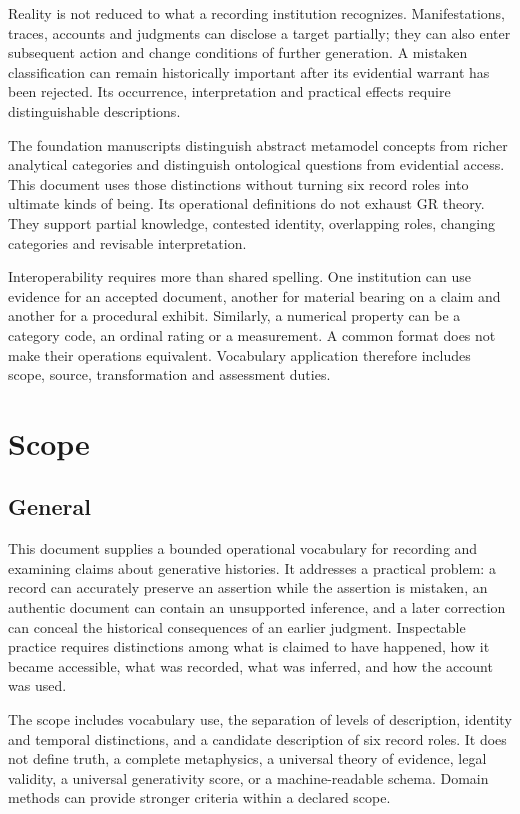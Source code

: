 \documentclass[11pt,a4paper]{article}
\begin{document}
Reality is not reduced to what a recording institution recognizes. Manifestations, traces, accounts and judgments can disclose a target partially; they can also enter subsequent action and change conditions of further generation. A mistaken classification can remain historically important after its evidential warrant has been rejected. Its occurrence, interpretation and practical effects require distinguishable descriptions.

The foundation manuscripts distinguish abstract metamodel concepts from richer analytical categories and distinguish ontological questions from evidential access. This document uses those distinctions without turning six record roles into ultimate kinds of being. Its operational definitions do not exhaust GR theory. They support partial knowledge, contested identity, overlapping roles, changing categories and revisable interpretation.

Interoperability requires more than shared spelling. One institution can use evidence for an accepted document, another for material bearing on a claim and another for a procedural exhibit. Similarly, a numerical property can be a category code, an ordinal rating or a measurement. A common format does not make their operations equivalent. Vocabulary application therefore includes scope, source, transformation and assessment duties.

\GSPmainmatter
\section{Scope}
\subsection{General}

This document supplies a bounded operational vocabulary for recording and examining claims about generative histories. It addresses a practical problem: a record can accurately preserve an assertion while the assertion is mistaken, an authentic document can contain an unsupported inference, and a later correction can conceal the historical consequences of an earlier judgment. Inspectable practice requires distinctions among what is claimed to have happened, how it became accessible, what was recorded, what was inferred, and how the account was used.

The scope includes vocabulary use, the separation of levels of description, identity and temporal distinctions, and a candidate description of six record roles. It does not define truth, a complete metaphysics, a universal theory of evidence, legal validity, a universal generativity score, or a machine-readable schema. Domain methods can provide stronger criteria within a declared scope.
\end{document}
